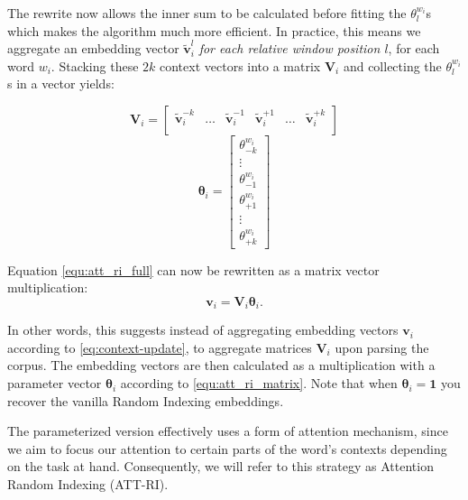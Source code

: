 \documentclass[11pt]{article}
\begin{document}
The rewrite now allows the inner sum to be calculated before fitting the $\theta_l^{w_i}$s which makes the algorithm much more efficient. In practice, this means we aggregate an embedding vector $\tilde{\textbf{v}}_i^l$ \emph{for each relative window position $l$}, for each word $w_i$. Stacking these $2k$ context vectors into a matrix $\textbf{V}_i$ and collecting the $\theta_l^{w_i}$s in a vector yields:

\begin{equation}
    \textbf{V}_i = 
          \begin{bmatrix}
            \tilde{\textbf{v}}_i^{-k} & \ldots & \tilde{\textbf{v}}_i^{-1} & \tilde{\textbf{v}}_i^{+1} & \ldots & \tilde{\textbf{v}}_i^{+k}    \\
          \end{bmatrix}
\end{equation}
\begin{equation}
    \boldsymbol\theta_{i} =
        \begin{bmatrix}
            \theta_{-k}^{w_i} \\
            \vdots \\
            \theta_{-1}^{w_i} \\
            \theta_{+1}^{w_i} \\
            \vdots \\
            \theta_{+k}^{w_i}
        \end{bmatrix}
\end{equation}

Equation \eqref{equ:att_ri_full} can now be rewritten as a matrix vector multiplication:
\begin{equation}\label{equ:att_ri_matrix}
    \textbf{v}_i = \textbf{V}_i\boldsymbol\theta_i.
\end{equation}

In other words, this suggests instead of aggregating embedding vectors $\textbf{v}_i$ according to \eqref{eq:context-update}, to aggregate matrices $\textbf{V}_i$ upon parsing the corpus. The embedding vectors are then calculated as a multiplication with a parameter vector $\boldsymbol\theta_i$ according to \eqref{equ:att_ri_matrix}. Note that when $\boldsymbol\theta_i = \textbf{1}$ you recover the vanilla Random Indexing embeddings.

The parameterized version effectively uses a form of attention mechanism, since we aim to focus our attention to certain parts of the word's contexts depending on the task at hand. Consequently, we will refer to this strategy as Attention Random Indexing (ATT-RI).
\end{document}
